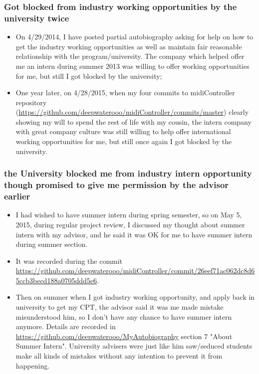 \documentclass[9pt,b5paper]{article}
\begin{document}
\subsubsection{Got blocked from industry working opportunities by the university twice}
\label{sec-12-3-9}
\begin{itemize}
\item On 4/29/2014, I have posted partial autobiography asking for help on how to get the industry working opportunities as well as maintain fair reasonable relationship with the program/university. The company which helped offer me an intern during summer 2013 was willing to offer working opportunities for me, but still I got blocked by the university;
\item One year later, on 4/28/2015, when my four commits to midiController repository (\url{https://github.com/deepwaterooo/midiController/commits/master}) clearly showing my will to spend the rest of life with my cousin, the intern company with great company culture was still willing to help offer international working opportunities for me, but still once again I got blocked by the university.
\end{itemize}

\subsubsection{the University blocked me from industry intern opportunity though promised to give me permission by the advisor earlier}
\label{sec-12-3-10}
\begin{itemize}
\item I had wished to have summer intern during spring semester, so on May 5, 2015, during regular project review, I discussed my thought about summer intern with my advisor, and he said it was OK for me to have summer intern during summer section.
\item It was recorded during the commit \url{https://github.com/deepwaterooo/midiController/commit/26eef71ac062dc8d65ccb3becd188a0705ddd5e6}.
\item Then on summer when I got industry working opportunity, and apply back in university to get my CPT, the advisor said it was me made mistake misunderstood him, so I don't have any chance to have summer intern anymore. Details are recorded in \url{https://github.com/deepwaterooo/MyAutobiography} section 7 "About Summer Intern". University advisers were just like him saw/seduced students make all kinds of mistakes without any intention to prevent it from happening.
\end{itemize}
\end{document}

